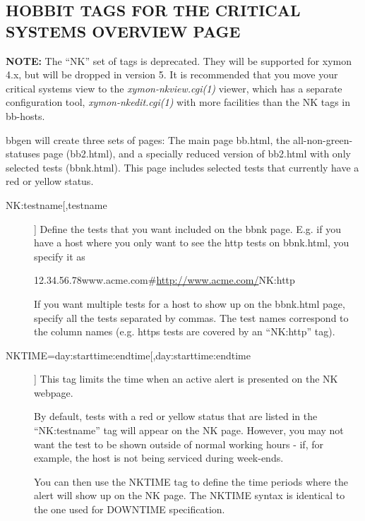 \subsection{HOBBIT TAGS FOR THE CRITICAL SYSTEMS OVERVIEW PAGE}
\textbf{NOTE:}
 The ``NK'' set of tags is deprecated. They will be supported for
 xymon 4.x, but will be dropped in version 5. It is recommended that
 you move your critical systems view to the
 \emph{xymon-nkview.cgi(1)} viewer, which has a separate
 configuration tool, \emph{xymon-nkedit.cgi(1)} with more facilities
 than the NK tags in bb-hosts. 


  bbgen will create three sets of pages: The main page bb.html, the
  all-non-green-statuses page (bb2.html), and a specially reduced
  version of bb2.html with only selected tests (bbnk.html). This page
  includes selected tests that currently have a red or yellow status. 



 \begin{description}
\item[NK:testname[,testname]] Define the tests that you want included
  on the bbnk page. E.g. if you have a host where you only want to see
  the http tests on bbnk.html, you specify it as 


  
12.34.56.78www.acme.com\#\url{http://www.acme.com/}NK:http 


  If you want multiple tests for a host to show up on the bbnk.html
  page, specify all the tests separated by commas. The test names
  correspond to the column names (e.g. https tests are covered by an
  ``NK:http'' tag). 



 

\item[NKTIME=day:starttime:endtime[,day:starttime:endtime]] This tag limits the time when an active alert is presented on the NK webpage. 

  By default, tests with a red or yellow status that are listed in the
  ``NK:testname'' tag will appear on the NK page. However, you may not
  want the test to be shown outside of normal working hours - if, for
  example, the host is not being serviced during week-ends. 



  You can then use the NKTIME tag to define the time periods where the
  alert will show up on the NK page. The NKTIME syntax is identical to
  the one used for DOWNTIME specification. 


\end{description}


